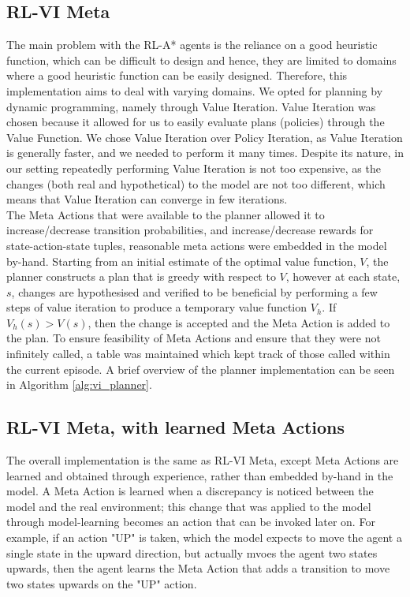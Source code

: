 \subsection{RL-VI Meta}
The main problem with the RL-A* agents is the reliance on a good heuristic function, which can be difficult to design and hence, they are limited to domains where a good heuristic function can be easily designed.
Therefore, this implementation aims to deal with varying domains. We opted for planning by dynamic programming, namely through Value Iteration. Value Iteration was chosen because it allowed for us to easily evaluate plans (policies) through the Value Function. We chose Value Iteration over Policy Iteration, as Value Iteration is generally faster, and we needed to perform it many times. Despite its nature, in our setting repeatedly performing Value Iteration is not too expensive, as the changes (both real and hypothetical) to the model are not too different, which means that Value Iteration can converge in few iterations.
\\The Meta Actions that were available to the planner allowed it to increase/decrease transition probabilities, and increase/decrease rewards for state-action-state tuples, reasonable meta actions were embedded in the model by-hand. Starting from an initial estimate of the optimal value function, $V$, the planner constructs a plan that is greedy with respect to $V$, however at each state, $s$, changes are hypothesised and verified to be beneficial by performing a few steps of value iteration to produce a temporary value function $V_h$. If $V_h(s) > V(s)$, then the change is accepted and the Meta Action is added to the plan.
To ensure feasibility of Meta Actions and ensure that they were not infinitely called, a table was maintained which kept track of those called within the current episode. A brief overview of the planner implementation can be seen in Algorithm \ref{alg:vi_planner}.
\subsection{RL-VI Meta, with learned Meta Actions}
The overall implementation is the same as RL-VI Meta, except Meta Actions are learned and obtained through experience, rather than embedded by-hand in the model. A Meta Action is learned when a discrepancy is noticed between the model and the real environment; this change that was applied to the model through model-learning becomes an action that can be invoked later on. For example, if an action "UP" is taken, which the model expects to move the agent a single state in the upward direction, but actually mvoes the agent two states upwards, then the agent learns the Meta Action that adds a transition to move two states upwards on the "UP" action.


